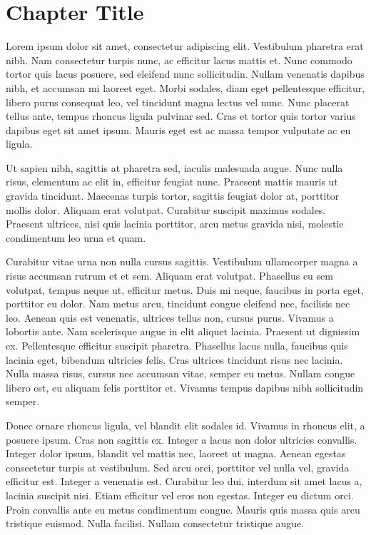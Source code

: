 \documentclass[a4paper]{memoir}
\begin{document}
\chapter{Chapter Title}
\label{chapterthreetitle}

Lorem ipsum dolor sit amet, consectetur adipiscing elit. Vestibulum pharetra erat nibh. Nam consectetur turpis nunc, ac efficitur lacus mattis et. Nunc commodo tortor quis lacus posuere, sed eleifend nunc sollicitudin. Nullam venenatis dapibus nibh, et accumsan mi laoreet eget. Morbi sodales, diam eget pellentesque efficitur, libero purus consequat leo, vel tincidunt magna lectus vel nunc. Nunc placerat tellus ante, tempus rhoncus ligula pulvinar sed. Cras et tortor quis tortor varius dapibus eget sit amet ipsum. Mauris eget est ac massa tempor vulputate ac eu ligula. 

Ut sapien nibh, sagittis at pharetra sed, iaculis malesuada augue. Nunc nulla risus, elementum ac elit in, efficitur feugiat nunc. Praesent mattis mauris ut gravida tincidunt. Maecenas turpis tortor, sagittis feugiat dolor at, porttitor mollis dolor. Aliquam erat volutpat. Curabitur suscipit maximus sodales. Praesent ultrices, nisi quis lacinia porttitor, arcu metus gravida nisi, molestie condimentum leo urna et quam. 

Curabitur vitae urna non nulla cursus sagittis. Vestibulum ullamcorper magna a risus accumsan rutrum et et sem. Aliquam erat volutpat. Phasellus eu sem volutpat, tempus neque ut, efficitur metus. Duis mi neque, faucibus in porta eget, porttitor eu dolor. Nam metus arcu, tincidunt congue eleifend nec, facilisis nec leo. Aenean quis est venenatis, ultrices tellus non, cursus purus. Vivamus a lobortis ante. Nam scelerisque augue in elit aliquet lacinia. Praesent ut dignissim ex. Pellentesque efficitur suscipit pharetra. Phasellus lacus nulla, faucibus quis lacinia eget, bibendum ultricies felis. Cras ultrices tincidunt risus nec lacinia. Nulla massa risus, cursus nec accumsan vitae, semper eu metus. Nullam congue libero est, eu aliquam felis porttitor et. Vivamus tempus dapibus nibh sollicitudin semper. 

Donec ornare rhoncus ligula, vel blandit elit sodales id. Vivamus in rhoncus elit, a posuere ipsum. Cras non sagittis ex. Integer a lacus non dolor ultricies convallis. Integer dolor ipsum, blandit vel mattis nec, laoreet ut magna. Aenean egestas consectetur turpis at vestibulum. Sed arcu orci, porttitor vel nulla vel, gravida efficitur est. Integer a venenatis est. Curabitur leo dui, interdum sit amet lacus a, lacinia suscipit nisi. Etiam efficitur vel eros non egestas. Integer eu dictum orci. Proin convallis ante eu metus condimentum congue. Mauris quis massa quis arcu tristique euismod. Nulla facilisi. Nullam consectetur tristique augue. 
\end{document}
